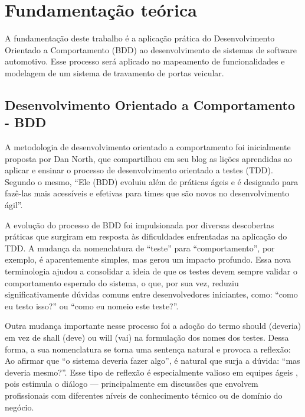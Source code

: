 \chapter{Fundamentação teórica}

A fundamentação deste trabalho é a aplicação prática do Desenvolvimento Orientado a Comportamento (BDD) ao desenvolvimento de sistemas de software automotivo. 
Esse processo será aplicado no mapeamento de funcionalidades e modelagem de um sistema de travamento de portas veicular.

\section{Desenvolvimento Orientado a Comportamento - BDD}

A metodologia de desenvolvimento orientado a comportamento foi inicialmente proposta por Dan North, que compartilhou em seu blog \cite{north2006bdd} as lições 
aprendidas ao aplicar e ensinar o processo de desenvolvimento orientado a testes (TDD). Segundo o mesmo, “Ele (BDD) evoluiu além de práticas ágeis e é designado 
para fazê-las mais acessíveis e efetivas para times que são novos no desenvolvimento ágil”.

A evolução do processo de BDD foi impulsionada por diversas descobertas práticas que surgiram em resposta às dificuldades enfrentadas na aplicação do TDD. A mudança 
da nomenclatura de “teste” para “comportamento”, por exemplo, é aparentemente simples, mas gerou um impacto profundo. Essa nova terminologia ajudou a consolidar a 
ideia de que os testes devem sempre validar o comportamento esperado do sistema, o que, por sua vez, reduziu significativamente dúvidas comuns entre desenvolvedores 
iniciantes, como: “como eu testo isso?” ou “como eu nomeio este teste?”.

Outra mudança importante nesse processo foi a adoção do termo should (deveria) em vez de shall (deve) ou will (vai) na formulação dos nomes dos testes. Dessa forma, 
a sua nomenclatura se torna uma sentença natural e provoca a reflexão: Ao afirmar que “o sistema deveria fazer algo”, é natural que surja a dúvida: “mas deveria mesmo?”. 
Esse tipo de reflexão é especialmente valioso em equipes ágeis \cite{atlassianAgileTeams}, pois estimula o diálogo — principalmente em discussões que envolvem 
profissionais com diferentes níveis de conhecimento técnico ou de domínio do negócio.

